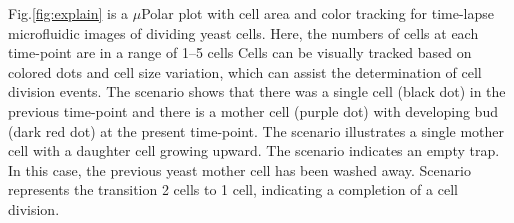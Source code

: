 \documentclass[conference]{IEEEtran}
\begin{document}
Fig.\ref{fig:explain} is a $\mu$Polar plot with cell area and color tracking for time-lapse microfluidic images of dividing yeast cells. Here, the numbers of cells at each time-point are in a range of 1--5 cells Cells can be visually tracked based on colored dots and cell size variation, which can assist the determination of cell division events.
The  scenario shows that there was a single cell (black dot) in the previous time-point and there is a mother cell (purple dot) with developing bud (dark red dot) at the present time-point. 
The  scenario illustrates a single mother cell with a daughter cell growing upward. 
The  scenario indicates an empty trap. In this case, the previous yeast mother cell has been washed away. 
Scenario  represents the transition 2 cells to 1 cell, indicating a completion of a cell division. 
\end{document}

